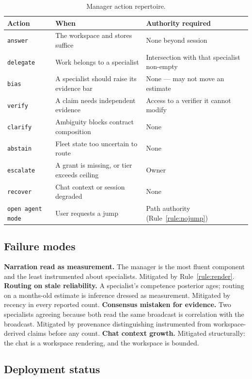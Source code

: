 \documentclass[11pt]{article}
\newcommand{\code}[1]{\texttt{\small #1}}
\begin{document}
\begin{table}[h]
\centering\small
\caption{Manager action repertoire.}
\label{tab:mgr-actions}
\begin{tabular}{@{}L{2.2cm}L{5.6cm}L{5.4cm}@{}}
\toprule
\textbf{Action} & \textbf{When} & \textbf{Authority required} \\
\midrule
\code{answer} & The workspace and stores suffice & None beyond session \\
\code{delegate} & Work belongs to a specialist & Intersection with that specialist non-empty \\
\code{bias} & A specialist should raise its evidence bar & None --- may not move an estimate \\
\code{verify} & A claim needs independent evidence & Access to a verifier it cannot modify \\
\code{clarify} & Ambiguity blocks contract composition & None \\
\code{abstain} & Fleet state too uncertain to route & None \\
\code{escalate} & A grant is missing, or tier exceeds ceiling & Owner \\
\code{recover} & Chat context or session degraded & None \\
\code{open agent mode} & User requests a jump & Path authority (Rule~\ref{rule:nojump}) \\
\bottomrule
\end{tabular}
\end{table}

\subsection{Failure modes}

\textbf{Narration read as measurement.} The manager is the most fluent component and the least instrumented about specialists. Mitigated by Rule~\ref{rule:render}.
\textbf{Routing on stale reliability.} A specialist's competence posterior ages; routing on a months-old estimate is inference dressed as measurement. Mitigated by recency in every reported count.
\textbf{Consensus mistaken for evidence.} Two specialists agreeing because both read the same broadcast is correlation with the broadcast. Mitigated by provenance distinguishing instrumented from workspace-derived claims before any count.
\textbf{Chat context growth.} Mitigated structurally: the chat is a workspace rendering, and the workspace is bounded.

\subsection{Deployment status}
\end{document}
